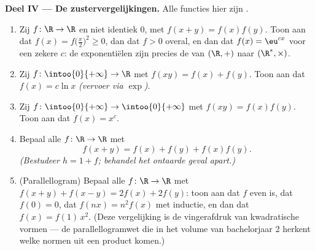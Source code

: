\begin{problem}[{Weekendopgave --- $f(x + y) = f(x) + f(y)$: regelmaat
dwingt lineariteit af, en het portret van de monsters}]
\medskip
\noindent\textbf{Deel IV --- De zustervergelijkingen.} Alle functies hier
zijn .
\begin{enumerate}[resume]
  \item Zij $f \colon \R \to \R$  en niet identiek $0$, met $f(x
        + y) = f(x)f(y)$. Toon aan dat $f(x) = f\bigl(\frac
        x2\bigr)^2 \geq 0$, dan dat $f > 0$ overal, en dan dat $f(x) =
        \eu^{cx}$ voor een zekere $c$: de exponentiëlen zijn precies de
          van $(\R, +)$ naar $(\R^*, \times)$.
  \item Zij $f \colon \intoo{0}{+\infty} \to \R$  met $f(xy) =
        f(x) + f(y)$. Toon aan dat $f(x) = c\ln x$ \emph{(vervoer via
        $\exp$)}.
  \item Zij $f \colon \intoo{0}{+\infty} \to \intoo{0}{+\infty}$ 
        met $f(xy) = f(x)f(y)$. Toon aan dat $f(x) = x^c$.
  \item Bepaal alle  $f \colon \R \to \R$ met
        \[
        f(x + y) = f(x) + f(y) + f(x)f(y) .
        \]
        \emph{(Bestudeer $h = 1 + f$; behandel het ontaarde geval
        apart.)}
  \item (Parallellogram) Bepaal alle  $f \colon \R \to \R$ met
        $f(x + y) + f(x - y) = 2f(x) + 2f(y)$: toon aan dat $f$ even is,
        dat $f(0) = 0$, dat $f(nx) = n^2 f(x)$ met inductie, en dan dat
        $f(x) = f(1)\,x^2$. (Deze vergelijking is de vingerafdruk van
        kwadratische vormen --- de parallellogramwet die in het volume
        van bachelorjaar 2 herkent welke normen uit een  product
        komen.)
\end{enumerate}


\end{problem}
